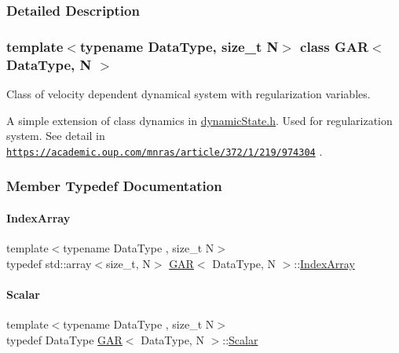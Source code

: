 \subsubsection{Detailed Description}
\subsubsection*{template$<$typename Data\+Type, size\+\_\+t N$>$\newline
class G\+A\+R$<$ Data\+Type, N $>$}

Class of velocity dependent dynamical system with regularization variables. 

A simple extension of class dynamics in \mbox{\hyperlink{dynamic_state_8h}{dynamic\+State.\+h}}. Used for regularization system. See detail in \href{https://academic.oup.com/mnras/article/372/1/219/974304}{\tt https\+://academic.\+oup.\+com/mnras/article/372/1/219/974304} . 

\subsubsection{Member Typedef Documentation}
\mbox{\label{class_g_a_r_aaf033049c0cd8f0f86a82b9595086fa5}} 
\paragraph{\texorpdfstring{Index\+Array}{IndexArray}}
{\footnotesize\ttfamily template$<$typename Data\+Type , size\+\_\+t N$>$ \\
typedef std\+::array$<$size\+\_\+t, N$>$ \mbox{\hyperlink{class_g_a_r}{G\+AR}}$<$ Data\+Type, N $>$\+::\mbox{\hyperlink{class_g_a_r_aaf033049c0cd8f0f86a82b9595086fa5}{Index\+Array}}}

\mbox{\label{class_g_a_r_a2ae44eda8e28d5dd26cf707dcda69314}} 
\paragraph{\texorpdfstring{Scalar}{Scalar}}
{\footnotesize\ttfamily template$<$typename Data\+Type , size\+\_\+t N$>$ \\
typedef Data\+Type \mbox{\hyperlink{class_g_a_r}{G\+AR}}$<$ Data\+Type, N $>$\+::\mbox{\hyperlink{class_g_a_r_a2ae44eda8e28d5dd26cf707dcda69314}{Scalar}}}

